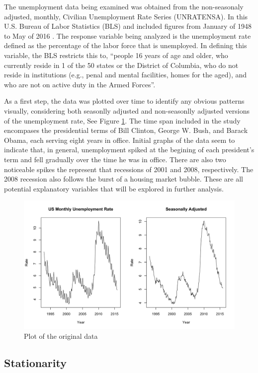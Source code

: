 {		The unemployment data being examined was obtained from the non-seasonaly adjusted, monthly, Civilian Unemployment Rate Series (UNRATENSA).  In this U.S. Bureau of Labor Statistics (BLS) and included figures from January of 1948 to  May of 2016 \citep{blsref}.  The response variable being analyzed is the unemployment rate defined as the percentage of the labor force that is unemployed.  In defining this variable, the BLS restricts this to, ``people 16 years of age and older, who currently reside in 1 of the 50 states or the District of Columbia, who do not reside in institutions (e.g., penal and mental facilities, homes for the aged), and who are not on active duty in the Armed Forces''. \newline
		
		As a first step, the data was plotted over time to identify any obvious patterns visually, considering both seasonlly adjusted and non-seasonlly adjusted versions of the unemployment rate, See Figure \ref{fig:unemployment}.  The time span included in the study encompases the presidential terms of Bill Clinton, George W. Bush, and Barack Obama, each serving eight years in office.  Initial graphs of the data seem to indicate that, in general, unemployment spiked at the begining of each president's term and fell gradually over the time he was in office. There are also two noticeable spikes the represent that recessions of 2001 and 2008, respectively.  The 2008 recession also follows the burst of a housing market bubble.  These are all potential explanatory variables that will be explored in further analysis.
		\begin{figure}[H]
			\centering
			\caption{Plot of the original data}
			\label{fig:unemployment}
			\includegraphics[width=.7\textwidth]{images/Unemployment}
		\end{figure}
		
		\subsection*{Stationarity}
						
}
